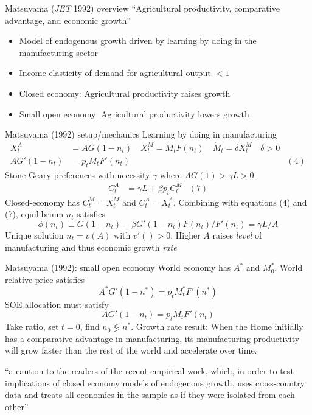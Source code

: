 \documentclass[11pt,notes=hide,aspectratio=169]{beamer}
\begin{document}
\begin{frame}{Matsuyama (\textit{JET} 1992) overview}
{\small ``Agricultural productivity, comparative advantage, and economic growth''}
\begin{itemize}
\item Model of endogenous growth driven by learning by doing in the manufacturing sector
\item Income elasticity of demand for agricultural output $<1$
\item Closed economy: Agricultural productivity raises growth
\item Small open economy: Agricultural productivity lowers growth
\end{itemize}
\end{frame}
\begin{frame}{Matsuyama (1992) setup/mechanics}
Learning by doing in manufacturing
\begin{align*}
X_t^A 
&=
A G(1-n_t)
\quad
X_t^M 
=
M_t F(n_t)
\quad
\dot{M}_t 
=
\delta X_t^M \quad \delta>0
\\
A G'(1-n_t)
&=
p_t M_t F'(n_t)
&(4)
\end{align*}
Stone-Geary preferences with necessity $\gamma$ where $AG(1)>\gamma L > 0$.
\begin{align*}
C_t^A &= \gamma L + \beta p_t C_t^M 
& (7)
\end{align*}
Closed-economy has $C_t^M=X_t^M$ and $C_t^A=X_t^A$. Combining with equations (4) and (7), equilibrium $n_t$ satisfies
$$
\phi(n_t)
\equiv
G(1-n_t)-\beta G'(1-n_t)F(n_t)/F'(n_t)
=
\gamma L / A
$$
Unique solution $n_t = v(A)$ with $v'()>0$.
Higher $A$ raises \textit{level} of manufacturing and thus economic growth \textit{rate}
\end{frame}
\begin{frame}{Matsuyama (1992): small open economy}
World economy has $A^{*}$ and $M_{0}^{*}$.
World relative price satisfies
$$
A^{*} G'(1-n^{*})
=
p_t M_t^{*} F'(n^{*})
$$
SOE allocation must satisfy
$$
A G'(1-n_t)
=
p_t M_t F'(n_t)
$$
Take ratio, set $t=0$, find $n_0 \lessgtr n^{*}$.
\smallskip
Growth rate result: When the Home initially has a comparative advantage in manufacturing,
its manufacturing productivity will grow faster than the rest of the world
and accelerate over time.
\smallskip
{\small ``a caution to the readers of the recent empirical work, which, in order to test implications of closed economy models of endogenous growth,
uses cross-country data and treats all economies in the sample as if they were isolated from each other''\par}
\end{frame}
\end{document}
